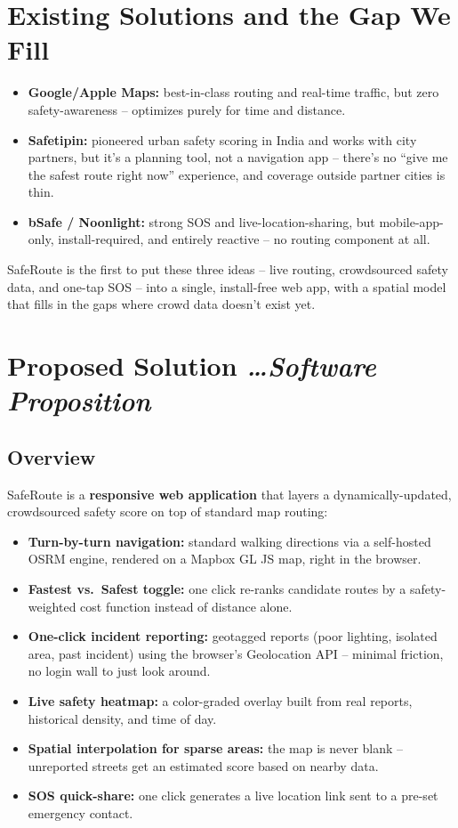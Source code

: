 \documentclass[11pt,a4paper]{article}
\newcommand{\BvrHint}[1]{%
  {\normalfont\normalsize\itshape\hfill #1}}
\begin{document}
\section{Existing Solutions and the Gap We Fill}
\begin{itemize}[leftmargin=0.7cm]
    \item \textbf{Google/Apple Maps:} best-in-class routing and
    real-time traffic, but zero safety-awareness -- optimizes
    purely for time and distance.
    \item \textbf{Safetipin:} pioneered urban safety scoring in
    India and works with city partners, but it's a planning tool,
    not a navigation app -- there's no ``give me the safest route
    right now'' experience, and coverage outside partner cities is
    thin.
    \item \textbf{bSafe / Noonlight:} strong SOS and
    live-location-sharing, but mobile-app-only, install-required,
    and entirely reactive -- no routing component at all.
\end{itemize}
SafeRoute is the first to put these three ideas -- live routing,
crowdsourced safety data, and one-tap SOS -- into a single,
install-free web app, with a spatial model that fills in the gaps
where crowd data doesn't exist yet.

\section{Proposed Solution %
\BvrHint{\ldots Software Proposition}}
\subsection{Overview}
SafeRoute is a \textbf{responsive web application} that layers a
dynamically-updated, crowdsourced safety score on top of standard
map routing:
\begin{itemize}[leftmargin=0.7cm]
    \item \textbf{Turn-by-turn navigation:} standard walking
    directions via a self-hosted OSRM engine, rendered on a Mapbox
    GL JS map, right in the browser.
    \item \textbf{Fastest vs.\ Safest toggle:} one click re-ranks
    candidate routes by a safety-weighted cost function instead of
    distance alone.
    \item \textbf{One-click incident reporting:} geotagged reports
    (poor lighting, isolated area, past incident) using the
    browser's Geolocation API -- minimal friction, no login wall
    to just look around.
    \item \textbf{Live safety heatmap:} a color-graded overlay
    built from real reports, historical density, and time of day.
    \item \textbf{Spatial interpolation for sparse areas:} the map
    is never blank -- unreported streets get an estimated score
    based on nearby data.
    \item \textbf{SOS quick-share:} one click generates a live
    location link sent to a pre-set emergency contact.
\end{itemize}
\end{document}
